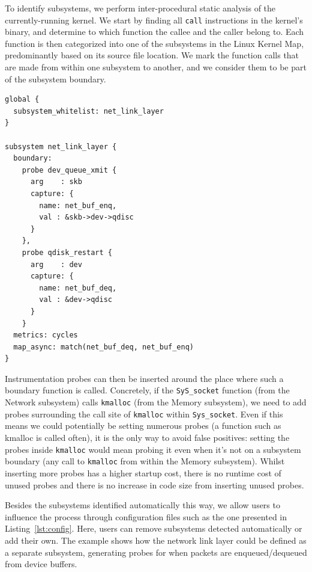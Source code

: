 \documentclass[letterpaper,twocolumn,10pt]{article}
\begin{document}
To identify subsystems, we perform inter-procedural static analysis of the
currently-running kernel. We start by finding all \texttt{call} instructions in
the kernel's binary, and determine to which function the callee and the caller
belong to. Each function is then categorized into one of the subsystems in the
Linux Kernel Map, predominantly based on its source file location. We mark the
function calls that are made from within one subsystem to another, and we
consider them to be part of the subsystem boundary.

\vspace{1em}
\lstset{style=customc, captionpos=b}
\begin{lstlisting}[caption={Sample configuration file defining a custom subsystem},label={lst:config}]
global {
  subsystem_whitelist: net_link_layer
}

subsystem net_link_layer {
  boundary:
    probe dev_queue_xmit {
      arg    : skb
      capture: {
        name: net_buf_enq,
        val : &skb->dev->qdisc
      }
    },
    probe qdisk_restart {
      arg    : dev
      capture: {
        name: net_buf_deq,
        val : &dev->qdisc
      }
    }
  metrics: cycles
  map_async: match(net_buf_deq, net_buf_enq)
}
\end{lstlisting}

Instrumentation probes can then be inserted around the place where such a boundary
function is called. Concretely, if the \texttt{SyS\_socket} function (from the
Network subsystem) calls \texttt{kmalloc} (from the Memory subsystem), we need
to add probes surrounding the call site of \texttt{kmalloc} within
\texttt{Sys\_socket}. Even if this means we could potentially be setting
numerous probes (a function such as kmalloc is called often), it is the
only way to avoid false positives: setting the probes inside \texttt{kmalloc}
would mean probing it even when it's not on a subsystem boundary (any call to
\texttt{kmalloc} from within the Memory subsystem). Whilst inserting more probes
has a higher startup cost, there is no runtime cost of unused probes and there
is no increase in code size from inserting unused probes.

Besides the subsystems identified automatically this way, we allow users to
influence the process through configuration files such as the one presented in
Listing~\ref{lst:config}. Here, users can remove subsystems detected
automatically or add their own. The example shows how the network link layer
could be defined as a separate subsystem, generating probes for when packets are
enqueued/dequeued from device buffers.
\end{document}
